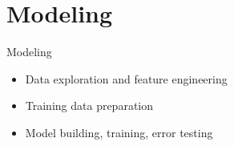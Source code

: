 \documentclass[
 size=12pt,
 paper=smartboard, %
 mode=present, %
 display=slides, %
style=tuliplab,
pauseslide,
fleqn,leqno]{powerdot}
\begin{document}

\section{Modeling}

\begin{slide}[toc=,bm=]{Modeling}
\begin{itemize}
  \item Data exploration and feature engineering\\
\vspace{1cm}
  \item  Training data preparation
\vspace{1CM}
  \item  Model building, training, error testing
\end{itemize}
\end{slide}
\end{document}
